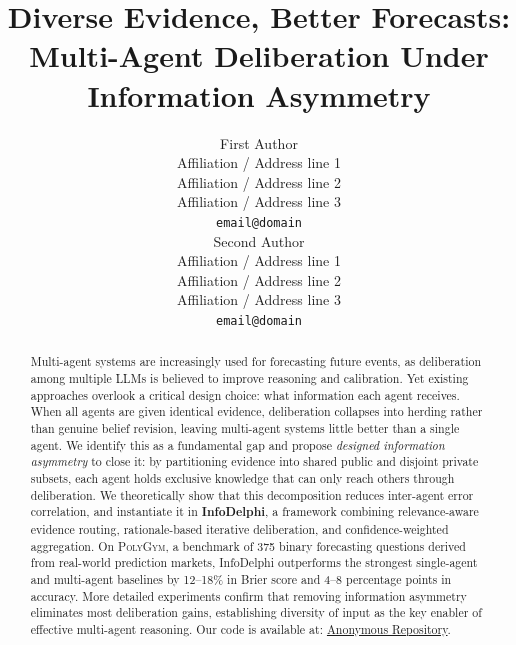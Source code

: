 \documentclass[11pt]{article}
\title{Diverse Evidence, Better Forecasts: Multi-Agent Deliberation Under Information Asymmetry}
\author{First Author \\
  Affiliation / Address line 1 \\
  Affiliation / Address line 2 \\
  Affiliation / Address line 3 \\
  \texttt{email@domain} \\\And
  Second Author \\
  Affiliation / Address line 1 \\
  Affiliation / Address line 2 \\
  Affiliation / Address line 3 \\
  \texttt{email@domain} \\}
\theoremstyle{plain}
\theoremstyle{definition}
\begin{document}
\maketitle
\begin{abstract}
Multi-agent systems are increasingly used for forecasting future events, as deliberation among multiple LLMs is believed to improve reasoning and calibration. Yet existing approaches overlook a critical design choice: what information each agent receives.
When all agents are given identical evidence, deliberation collapses into herding rather than genuine belief revision, leaving multi-agent systems little better than a single agent. 
We identify this as a fundamental gap and propose \textit{designed information asymmetry} to close it: by partitioning evidence into shared public and disjoint private subsets, each agent holds exclusive knowledge that can only reach others through deliberation.
We theoretically show that this decomposition reduces inter-agent error correlation, and instantiate it in \textbf{InfoDelphi}, a framework combining relevance-aware evidence routing, rationale-based iterative deliberation, and confidence-weighted aggregation.
On \textsc{PolyGym}, a benchmark of 375 binary forecasting questions derived from real-world prediction markets, InfoDelphi outperforms the strongest single-agent and multi-agent baselines by 12--18\% in Brier score and 4--8 percentage points in accuracy.
More detailed experiments confirm that removing information asymmetry eliminates most deliberation gains, establishing diversity of input as the key enabler of effective multi-agent reasoning.
Our code is available at: \href{https://anonymous.4open.science/r/InfoDelphi}{Anonymous Repository}.
\end{abstract}
\end{document}
